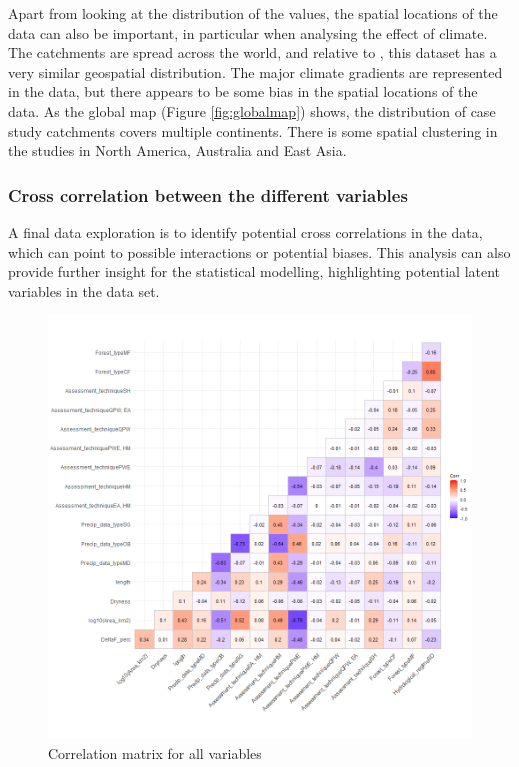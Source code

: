 \documentclass[]{elsarticle} %
\begin{document}
Apart from looking at the distribution of the values, the spatial locations of the data can also be important, in particular when analysing the effect of climate. The catchments are spread across the world, and relative to \citet{zhang2017}, this dataset has a very similar geospatial distribution. The major climate gradients are represented in the data, but there appears to be some bias in the spatial locations of the data. As the global map (Figure \ref{fig:globalmap}) shows, the distribution of case study catchments covers multiple continents. There is some spatial clustering in the studies in North America, Australia and East Asia.

\hypertarget{cross-correlation-between-the-different-variables}{%
\subsubsection{Cross correlation between the different variables}\label{cross-correlation-between-the-different-variables}}

A final data exploration is to identify potential cross correlations in the data, which can point to possible interactions or potential biases. This analysis can also provide further insight for the statistical modelling, highlighting potential latent variables in the data set.

\begin{figure}
\includegraphics[width=0.9\linewidth]{variable_corr_plot} \caption{Correlation matrix for all variables}\label{fig:corgraphs}
\end{figure}
\end{document}
